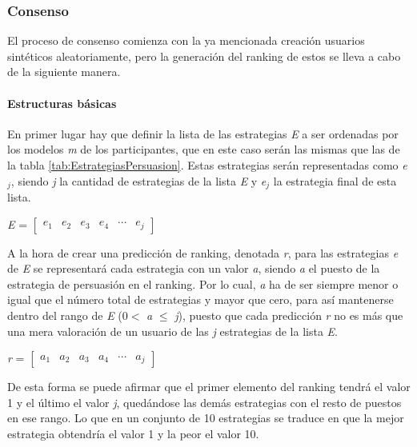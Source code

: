\subsubsection{Consenso}
El proceso de consenso comienza con la ya mencionada creación usuarios sintéticos aleatoriamente, pero la generación del ranking de estos se lleva a cabo de la siguiente manera.

\paragraph{Estructuras básicas} En primer lugar hay que definir la lista de las estrategias \textit{E} a ser ordenadas por los modelos \textit{m} de los participantes, que en este caso serán las mismas que las de la tabla \ref{tab:EstrategiasPersuasion}. Estas estrategias serán representadas como \textit{e$_{j}$}, siendo \textit{j} la cantidad de estrategias de la lista \textit{E} y \textit{e$_{j}$} la estrategia final de esta lista. 
\begin{center}
    \textit{E} = $\begin{bmatrix} \textit{e$_{1}$} & \textit{e$_{2}$} & \textit{e$_{3}$} & \textit{e$_{4}$} & \cdots & \textit{e$_{j}$} \end{bmatrix}$ 
\end{center}
A la hora de crear una predicción de ranking, denotada \textit{r}, para las estrategias \textit{e} de \textit{E} se representará cada estrategia con un valor \textit{a}, siendo \textit{a} el puesto de la estrategia de persuasión en el ranking. Por lo cual, \textit{a} ha de ser siempre menor o igual que el número total de estrategias y mayor que cero, para así mantenerse dentro del rango de \textit{E} (0$<$
\textit{a }$\leq$\textit{ j}), puesto que cada predicción \textit{r} no es más que una mera valoración de un usuario de las \textit{j} estrategias de la lista \textit{E}.
\begin{center}
    \textit{r} = $\begin{bmatrix} \textit{a$_{1}$} & \textit{a$_{2}$} & \textit{a$_{3}$} & \textit{a$_{4}$} & \cdots & \textit{a$_{j}$} \end{bmatrix}$ 
\end{center}
De esta forma se puede afirmar que el primer elemento del ranking tendrá el valor 1 y el último el valor \textit{j}, quedándose las demás estrategias con el resto de puestos en ese rango. Lo que en un conjunto de 10 estrategias se traduce en que la mejor estrategia obtendría el valor 1 y la peor el valor 10.
\\ \\
